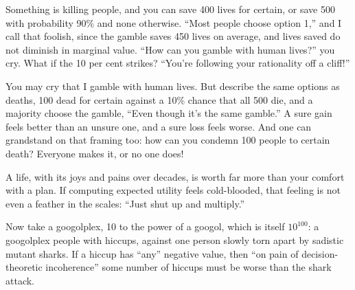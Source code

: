 
Something is killing people, and you can save 400 lives for certain, or save 500 with probability 90\% and none otherwise. ``Most people choose option 1,'' and I call that foolish, since the gamble saves 450 lives on average, and lives saved do not diminish in marginal value. ``How can you gamble with human lives?'' you cry. What if the 10 per cent strikes? ``You're following your rationality off a cliff!'' 

You may cry that I gamble with human lives. But describe the same options as deaths, 100 dead for certain against a 10\% chance that all 500 die, and a majority choose the gamble, ``Even though it's the same gamble.'' A sure gain feels better than an unsure one, and a sure loss feels worse. And one can grandstand on that framing too: how can you condemn 100 people to certain death? Everyone makes it, or no one does! 

A life, with its joys and pains over decades, is worth far more than your comfort with a plan. If computing expected utility feels cold-blooded, that feeling is not even a feather in the scales: ``Just shut up and multiply.''

Now take a googolplex, 10 to the power of a googol, which is itself $10^{100}$: a googolplex people with hiccups, against one person slowly torn apart by sadistic mutant sharks. If a hiccup has ``any'' negative value, then ``on pain of decision-theoretic incoherence'' some number of hiccups must be worse than the shark attack. 

